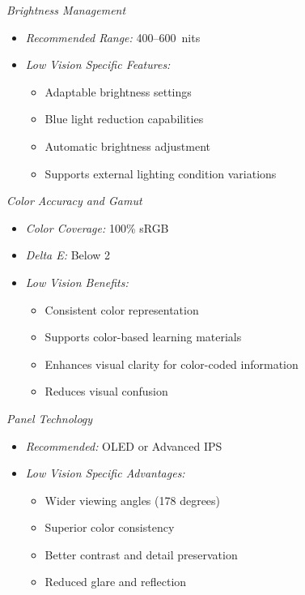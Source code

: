 \textit{Brightness Management}
\begin{itemize}
    \item \emph{Recommended Range:} 400--600~nits
    \item \emph{Low Vision Specific Features:}
        \begin{itemize}
            \item Adaptable brightness settings
            \item Blue light reduction capabilities
            \item Automatic brightness adjustment
            \item Supports external lighting condition variations
        \end{itemize}
\end{itemize}

\textit{Color Accuracy and Gamut}
\begin{itemize}
    \item \emph{Color Coverage:} 100\% sRGB
    \item \emph{Delta E:} Below 2
    \item \emph{Low Vision Benefits:}
        \begin{itemize}
            \item Consistent color representation
            \item Supports color-based learning materials
            \item Enhances visual clarity for color-coded information
            \item Reduces visual confusion
        \end{itemize}
\end{itemize}

\textit{Panel Technology}
\begin{itemize}
    \item \emph{Recommended:} OLED or Advanced IPS
    \item \emph{Low Vision Specific Advantages:}
        \begin{itemize}
            \item Wider viewing angles (178 degrees)
            \item Superior color consistency
            \item Better contrast and detail preservation
            \item Reduced glare and reflection
        \end{itemize}
\end{itemize}

